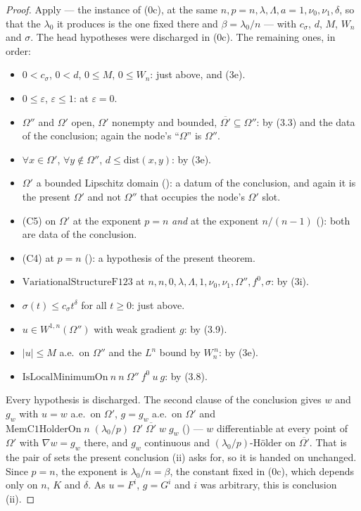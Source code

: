 \begin{proof}
Apply  --- the instance of (0c), at the same
$n,p=n,\lambda,\Lambda,a=1,\nu_0,\nu_1,\delta$, so that the $\lambda_0$ it
produces is the one fixed there and $\beta=\lambda_0/n$ --- with
$c_\sigma$, $d$, $M$, $W_n$ and $\sigma$.  The head hypotheses were discharged in
(0c).  The remaining ones, in order:
\begin{itemize}
\item $0<c_\sigma$, $0<d$, $0\le M$, $0\le W_n$: just above, and (3e).
\item $0\le\varepsilon$, $\varepsilon\le1$: at $\varepsilon=0$.
\item $\Omega''$ and $\Omega'$ open, $\Omega'$ nonempty and bounded,
  $\overline{\Omega'}\subseteq\Omega''$: by (3.3) and the data of the
  conclusion; again the node's ``$\Omega$'' is $\Omega''$.
\item $\forall x\in\Omega'$, $\forall y\notin\Omega''$,
  $d\le\mathrm{dist}(x,y)$: by (3e).
\item $\Omega'$ a bounded Lipschitz domain
  (): a datum of the conclusion, and again it
  is the present $\Omega'$ and not $\Omega''$ that occupies the node's $\Omega'$
  slot.
\item (C5) on $\Omega'$ at the exponent $p=n$ \emph{and} at the exponent
  $n/(n-1)$ (): both are data of the conclusion.
\item (C4) at $p=n$ (): a hypothesis of the
  present theorem.
\item $\mathrm{VariationalStructureF123}$ at
  $n,n,0,\lambda,\Lambda,1,\nu_0,\nu_1,\Omega'',f^0,\sigma$: by (3i).
\item $\sigma(t)\le c_\sigma t^\delta$ for all $t\ge0$: just above.
\item $u\in W^{1,n}(\Omega'')$ with weak gradient $g$: by (3.9).
\item $|u|\le M$ a.e.\ on $\Omega''$ and the $L^n$ bound by $W_n^{\,n}$: by (3e).
\item $\mathrm{IsLocalMinimumOn}\ n\ n\ \Omega''\ f^0\ u\ g$: by (3.8).
\end{itemize}
Every hypothesis is discharged.  The second clause of the conclusion gives $w$
and $g_w$ with $u=w$ a.e.\ on $\Omega'$, $g=g_w$ a.e.\ on $\Omega'$ and
$\mathrm{MemC1HolderOn}\;n\;(\lambda_0/p)\;\Omega'\;\overline{\Omega'}\;w\;g_w$
() --- $w$ differentiable at every point of $\Omega'$
with $\nabla w=g_w$ there, and $g_w$ continuous and
$(\lambda_0/p)$-H\"older on $\overline{\Omega'}$.  That is the pair of sets the
present conclusion (ii) asks for, so it is handed on unchanged.  Since $p=n$, the exponent is $\lambda_0/n=\beta$, the
constant fixed in (0c), which depends only on $n$, $K$ and $\delta$.  As $u=F^i$,
$g=G^i$ and $i$ was arbitrary, this is conclusion (ii).
\end{proof}
